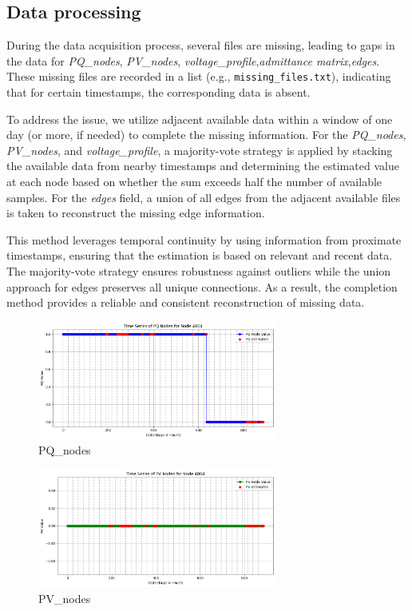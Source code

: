 \documentclass[12pt]{article}
\begin{document}
\subsection*{Data processing}
During the data acquisition process, several files are missing, leading to gaps in the data for \emph{PQ\_nodes}, \emph{PV\_nodes}, \emph{voltage\_profile},\emph{admittance matrix},\emph{edges}. These missing files are recorded in a list (e.g., \texttt{missing\_files.txt}), indicating that for certain timestamps, the corresponding data is absent.

To address the issue, we utilize adjacent available data within a window of one day (or more, if needed) to complete the missing information. For the \emph{PQ\_nodes}, \emph{PV\_nodes}, and \emph{voltage\_profile}, a majority-vote strategy is applied by stacking the available data from nearby timestamps and determining the estimated value at each node based on whether the sum exceeds half the number of available samples. For the \emph{edges} field, a union of all edges from the adjacent available files is taken to reconstruct the missing edge information.

This method leverages temporal continuity by using information from proximate timestamps, ensuring that the estimation is based on relevant and recent data. The majority-vote strategy ensures robustness against outliers while the union approach for edges preserves all unique connections. As a result, the completion method provides a reliable and consistent reconstruction of missing data.

\begin{figure}[H]
    \centering
    \includegraphics[width=0.7\textwidth]{picture/PQ_nodes.png}
    \caption{PQ\_nodes}
\label{fig:PQ_nodes}
\end{figure}

\begin{figure}[H]
    \centering
    \includegraphics[width=0.7\textwidth]{picture/PV_nodes.png}
    \caption{PV\_nodes}
\label{fig:PV_nodes}
\end{figure}
\end{document}
